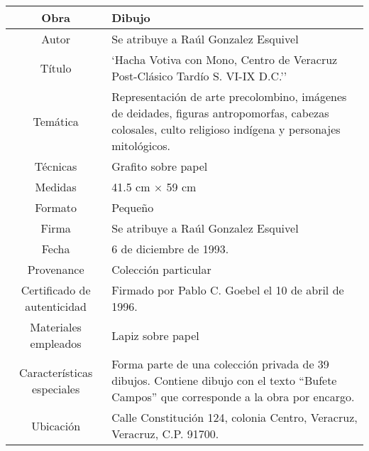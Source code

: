 \documentclass[10pt,letter]{report}
\begin{document}
\begin{table}[H]
\centering
\begin{tabular}{|c|m{}|}
\hline
Obra& Dibujo	\\
\hline
Autor & Se atribuye a Ra\'ul Gonzalez Esquivel\\
\hline
T\'itulo & `Hacha Votiva con Mono, Centro de Veracruz Post-Cl\'asico Tard\'io S. VI-IX D.C.''\\
\hline
Tem\'atica & Representaci\'on de arte precolombino, im\'agenes de deidades, figuras antropomorfas, cabezas colosales, culto religioso ind\'igena y personajes mitol\'ogicos.\\
\hline
T\'ecnicas &Grafito sobre papel \\
\hline
Medidas & 41.5 cm $\times$ 59 cm \\
\hline
 Formato & Peque\~no \\
 \hline
 Firma & Se atribuye a Ra\'ul Gonzalez Esquivel\\ 
 \hline
  Fecha & 6 de diciembre de 1993.\\
 \hline
 Provenance & Colecci\'on particular\\
 \hline
 Certificado de autenticidad& Firmado por Pablo C. Goebel el 10 de abril de 1996.  \\
 \hline 
  Materiales empleados & Lapiz sobre papel\\
 \hline
 Caracter\'isticas especiales & Forma parte de una colecci\'on privada de 39 dibujos. 
Contiene dibujo con el texto ``Bufete Campos'' que corresponde a la obra por encargo. \\
\hline 
Ubicaci\'on & Calle Constituci\'on 124, colonia Centro, Veracruz, Veracruz, C.P. 91700.\\
\hline

\end{tabular}
\end{table}
\end{document}
